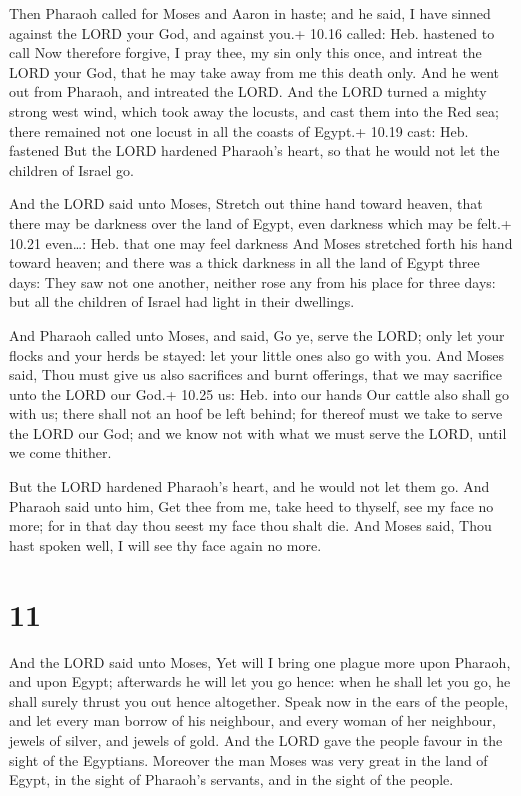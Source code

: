  Then Pharaoh called for Moses and Aaron in haste; and he
said, I have sinned against the LORD your God, and against you.+ 10.16
called: Heb. hastened to call  Now therefore forgive, I
pray thee, my sin only this once, and intreat the LORD your God, that he
may take away from me this death only.  And he went out
from Pharaoh, and intreated the LORD.  And the LORD turned
a mighty strong west wind, which took away the locusts, and cast them
into the Red sea; there remained not one locust in all the coasts of
Egypt.+ 10.19 cast: Heb. fastened  But the LORD hardened
Pharaoh's heart, so that he would not let the children of Israel go.

 And the LORD said unto Moses, Stretch out thine hand
toward heaven, that there may be darkness over the land of Egypt, even
darkness which may be felt.+ 10.21 even\ldots: Heb. that one may feel
darkness  And Moses stretched forth his hand toward heaven;
and there was a thick darkness in all the land of Egypt three days:
 They saw not one another, neither rose any from his place
for three days: but all the children of Israel had light in their
dwellings.

 And Pharaoh called unto Moses, and said, Go ye, serve
the LORD; only let your flocks and your herds be stayed: let your little
ones also go with you.  And Moses said, Thou must give us
also sacrifices and burnt offerings, that we may sacrifice unto the LORD
our God.+ 10.25 us: Heb. into our hands  Our cattle also
shall go with us; there shall not an hoof be left behind; for thereof
must we take to serve the LORD our God; and we know not with what we
must serve the LORD, until we come thither.

 But the LORD hardened Pharaoh's heart, and he would not
let them go.  And Pharaoh said unto him, Get thee from me,
take heed to thyself, see my face no more; for in that day thou seest my
face thou shalt die.  And Moses said, Thou hast spoken
well, I will see thy face again no more.

\hypertarget{section-10}{%
\section{11}\label{section-10}}

 And the LORD said unto Moses, Yet will I bring one plague
more upon Pharaoh, and upon Egypt; afterwards he will let you go hence:
when he shall let you go, he shall surely thrust you out hence
altogether.  Speak now in the ears of the people, and let
every man borrow of his neighbour, and every woman of her neighbour,
jewels of silver, and jewels of gold.  And the LORD gave the
people favour in the sight of the Egyptians. Moreover the man Moses was
very great in the land of Egypt, in the sight of Pharaoh's servants, and
in the sight of the people.

